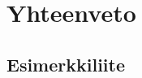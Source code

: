 \documentclass[finnish, authoryear]{config/tauthesis}
\theoremstyle{definition}
\begin{document}
\chapter{Yhteenveto}
\label{ch:yhteenveto}

\printbibliography[heading=bibintoc]

\begin{appendices}
\chapter{Esimerkkiliite}
\label{ch:liite}

\end{appendices}
\end{document}
